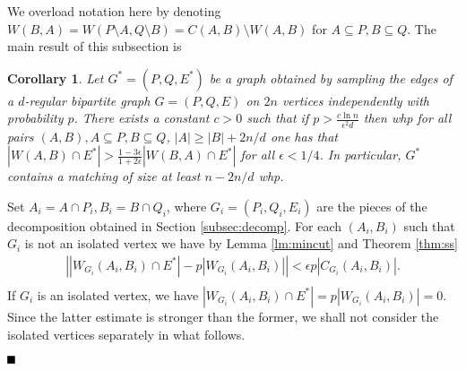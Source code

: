\documentclass[11pt]{article}
\newcommand{\qed}{\mbox{}\hspace*{\fill}\nolinebreak\mbox{$\rule{0.6em}{0.6em}$}
}
\newcommand{\e}{{\epsilon}}
\newtheorem{corollary}[theorem]{Corollary}
\newenvironment{proof}{{\bf Proof:}}{$\qed$\par}
\begin{document}
We overload notation here by denoting $W(B, A)=W(P\setminus A, Q\setminus B)=C(A, B)\setminus W(A, B)$ for $A\subseteq P, B\subseteq Q$. The main result of this subsection is
\begin{corollary} \label{cor:unbalanced-ws}
Let $G^*=(P, Q, E^*)$ be a graph obtained by sampling the edges of a $d$-regular bipartite graph $G=(P, Q, E)$ on $2n$ vertices independently with probability $p$. There exists a constant $c>0$ such that if $p>\frac{c\ln n}{\e^2 d}$ then whp for all pairs $(A, B), A\subseteq P, B\subseteq Q$, $|A|\geq |B|+2n/d$ one has that 
$|W(A,B)\cap E^*|>\frac{1-3\e}{1+2\e} |W(B, A)\cap E^*|$ for all $\e<1/4$. In particular, $G^*$ contains a matching of size at least $n-2n/d$ whp.
\end{corollary}
\begin{proof}
Set $A_i=A\cap P_i, B_i=B\cap Q_i$, where $G_i=(P_i, Q_i, E_i)$ are the pieces of the decomposition obtained in Section \ref{subsec:decomp}. For each $(A_i, B_i)$ such that $G_i$ is not an isolated vertex we have by Lemma \ref{lm:mincut} and Theorem \ref{thm:ss}
\begin{equation*}
\begin{split}
\left||W_{G_i}(A_i, B_i)\cap E^*|-p|W_{G_i}(A_i, B_i)|\right|<\e p|C_{G_i}(A_i, B_i)|.\\
\end{split}
\end{equation*}
If $G_i$ is an isolated vertex, we have $|W_{G_i}(A_i, B_i)\cap E^*|=p|W_{G_i}(A_i, B_i)|=0$. Since the latter estimate is stronger than the former, we shall not consider the isolated vertices separately in what follows.


\end{proof}
\end{document}
